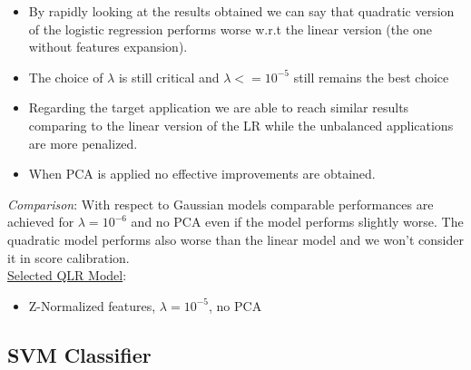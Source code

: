 \documentclass[10pt, a4paper, twocolumn]{article} %
\begin{document}
\begin{itemize}
	\item By rapidly looking at the results obtained we can say that quadratic version of the logistic regression
	performs worse w.r.t the linear version (the one without features expansion).
	\item The choice of $\lambda$ is still critical and $\lambda <= 10^{-5}$ still remains the best choice
	\item Regarding the target application
	we are able to reach similar results comparing to the linear version of the LR while the unbalanced applications
	are more penalized.
	\item When PCA is applied no effective improvements are obtained.
	
\end{itemize}


\textit{Comparison}: With respect to Gaussian models comparable performances are achieved for $\lambda=10^{-6}$ and
no PCA even if the model performs slightly worse. The quadratic model performs also worse than the linear model and
we won't consider it in score calibration.
\\ 
\underline{Selected QLR Model}: 
\begin{itemize}
	\item Z-Normalized features, $\lambda=10^{-5}$, no PCA
\end{itemize}
\subsection{SVM Classifier}
\end{document}
